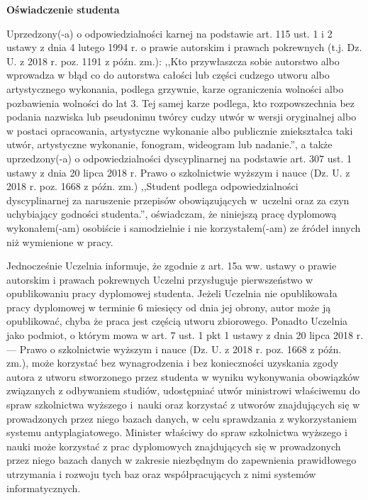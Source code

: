 \documentclass[11pt]{aghdpl}
\begin{document}

\newpage
\begin{center}
        {\bf\large\textsf{Oświadczenie studenta}}
\end{center}

{\sf Uprzedzony(-a) o odpowiedzialności karnej na podstawie art. 115 ust. 1 i 2 ustawy z dnia 4 lutego 1994 r. o prawie autorskim i prawach pokrewnych (t.j. Dz. U. z 2018 r. poz. 1191 z późn. zm.): ,,Kto przywłaszcza sobie autorstwo albo wprowadza w błąd co do autorstwa całości lub części cudzego utworu albo artystycznego wykonania, podlega grzywnie, karze ograniczenia wolności albo pozbawienia wolności do lat 3. Tej samej karze podlega, kto rozpowszechnia bez podania nazwiska lub pseudonimu twórcy cudzy utwór w wersji oryginalnej albo w postaci opracowania, artystyczne wykonanie albo publicznie zniekształca taki utwór, artystyczne wykonanie, fonogram, wideogram lub nadanie.'', a także uprzedzony(-a) o odpowiedzialności dyscyplinarnej na podstawie art. 307 ust. 1 ustawy z dnia 20 lipca 2018 r. Prawo o szkolnictwie wyższym i nauce (Dz. U. z 2018 r. poz. 1668 z późn. zm.) ,,Student podlega odpowiedzialności dyscyplinarnej za naruszenie przepisów obowiązujących w~uczelni oraz za czyn uchybiający godności studenta.'', oświadczam, że niniejszą pracę dyplomową wykonałem(-am) osobiście i samodzielnie i nie korzystałem(-am) ze źródeł innych niż wymienione w pracy.

\bigskip

Jednocześnie Uczelnia informuje, że zgodnie z art. 15a ww. ustawy o prawie autorskim i prawach pokrewnych Uczelni przysługuje pierwszeństwo w opublikowaniu pracy dyplomowej studenta. Jeżeli Uczelnia nie opublikowała pracy dyplomowej w terminie 6 miesięcy od dnia jej obrony, autor może ją opublikować, chyba że praca jest częścią utworu zbiorowego. Ponadto Uczelnia jako podmiot, o którym mowa w art. 7 ust. 1 pkt 1 ustawy z dnia 20 lipca 2018 r. --- Prawo o szkolnictwie wyższym i nauce (Dz. U. z 2018 r. poz. 1668 z późn. zm.), może korzystać bez wynagrodzenia i bez konieczności uzyskania zgody autora z utworu stworzonego przez studenta w wyniku wykonywania obowiązków związanych z odbywaniem studiów, udostępniać utwór ministrowi właściwemu do spraw szkolnictwa wyższego i~nauki oraz korzystać z utworów znajdujących się w prowadzonych przez niego bazach danych, w celu sprawdzania z wykorzystaniem systemu antyplagiatowego. Minister właściwy do spraw szkolnictwa wyższego i nauki może korzystać z prac dyplomowych znajdujących się w prowadzonych przez niego bazach danych w zakresie niezbędnym do zapewnienia prawidłowego utrzymania i rozwoju tych baz oraz współpracujących z nimi systemów informatycznych.}
\end{document}

